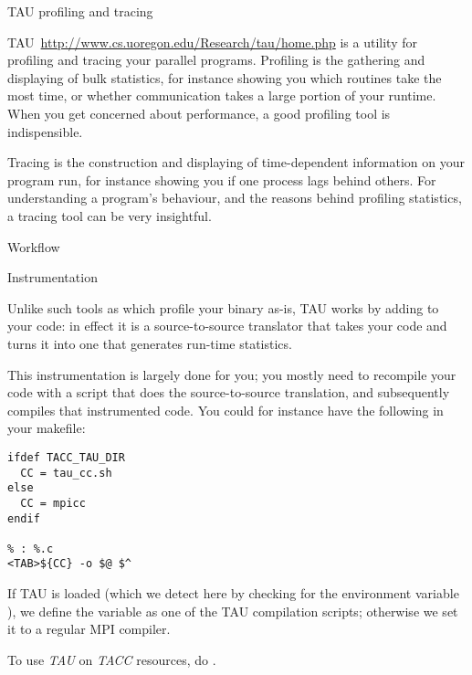 
 {TAU profiling and tracing}

TAU~\url{http://www.cs.uoregon.edu/Research/tau/home.php} is a utility
for profiling and tracing your parallel programs. Profiling is the
gathering and displaying of bulk statistics, for instance showing you
which routines take the most time, or whether communication takes a
large portion of your runtime. When you get concerned about
performance, a good profiling tool is indispensible.

Tracing is the construction and displaying of time-dependent
information on  your program run, for instance showing you if one
process lags behind others. For understanding a program's behaviour,
and the reasons behind profiling statistics, a tracing tool can be
very insightful.

 {Workflow}

 {Instrumentation}

Unlike such tools as  which profile your binary as-is,
TAU works by adding  to your code: in
effect it is a source-to-source translator that takes your code and
turns it into one that generates run-time statistics.

This instrumentation is largely done for you; you mostly need to recompile
your code with a script that does the source-to-source translation,
and subsequently compiles that instrumented code.
You could for instance have the following in your makefile:
\begin{verbatim}
ifdef TACC_TAU_DIR
  CC = tau_cc.sh
else
  CC = mpicc
endif

% : %.c
<TAB>${CC} -o $@ $^
\end{verbatim}
If TAU is loaded (which we detect here by checking for the environment variable
), we define the  variable as
one of the TAU compilation scripts; otherwise we set it to a regular MPI compiler.

\begin{istc}
To use \emph{TAU} on \emph{TACC} resources,
do .
\end{istc}

